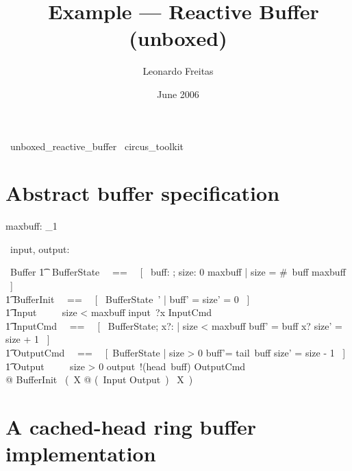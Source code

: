 \documentclass{article}
\begin{document}
\title{\Circus\ Example --- Reactive Buffer (unboxed)}
\author{Leonardo Freitas}
\date{June 2006}

\maketitle

\begin{zsection}
  \SECTION\ unboxed\_reactive\_buffer \parents\ circus\_toolkit
\end{zsection}

\section{Abstract buffer specification}

\begin{axdef}
  maxbuff: \nat_1
\end{axdef}

\begin{circus}
   \circchannel\ input, output: \nat
\end{circus}

\begin{circus}
  \circprocess\ Buffer \circdef \circbegin
  \also %
    \t1 \circstate\ BufferState ~~==~~ [~ buff: \seq \nat; size: 0 \upto maxbuff | size = \#~buff \leq maxbuff ~] \\ %
    \t1 BufferInit ~~==~~ [~ BufferState~' | buff' = \langle\rangle \land size' = 0 ~] \\
    \t1 Input ~~\circdef~~ \lcircguard size < maxbuff \rcircguard \circguard input~?x \then InputCmd \\
    \t1 InputCmd ~~==~~ [~ \Delta BufferState; x?: \nat | size < maxbuff \land buff' = buff \cat \langle x? \rangle \land size' = size + 1 ~] \\
    \t1 OutputCmd ~~==~~ [~\Delta BufferState | size > 0 \land buff'= tail~buff \land size' = size - 1 ~] \\
    \t1 Output ~~\circdef~~ \lcircguard size > 0 \rcircguard \circguard output~!(head~buff) \then OutputCmd \\
  @ BufferInit \circseq\ (~\circmu X @ (~Input \extchoice Output~) \circseq\ X~) \\
  \circend
\end{circus}


\section{A cached-head ring buffer implementation}
\end{document}

